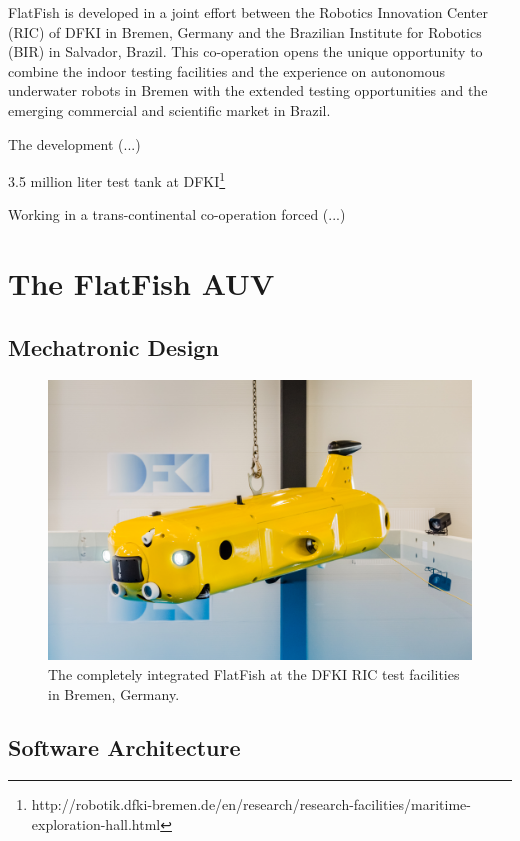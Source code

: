 \documentclass[conference]{IEEEtran}
\begin{document}
FlatFish is developed in a joint effort between the Robotics Innovation Center (RIC) of DFKI in Bremen, Germany and the Brazilian Institute for Robotics (BIR) in Salvador, Brazil. This co-operation opens the unique opportunity to combine the indoor testing facilities and the experience on autonomous underwater robots in Bremen with the extended testing opportunities and the emerging commercial and scientific market in Brazil.

The development (...)

3.5 million liter test tank at DFKI\footnote{http://robotik.dfki-bremen.de/en/research/research-facilities/maritime-exploration-hall.html}

Working in a trans-continental co-operation forced (...)

\section{The FlatFish AUV}

\subsection{Mechatronic Design}


\begin{figure}[!t]
	\centering
	\includegraphics[width=0.9\columnwidth]{FlatFish-1.jpg}
	\caption{The completely integrated FlatFish at the DFKI RIC test facilities in Bremen, Germany.}
	\label{fig:flatfish1}
\end{figure}


\subsection{Software Architecture}
\end{document}
